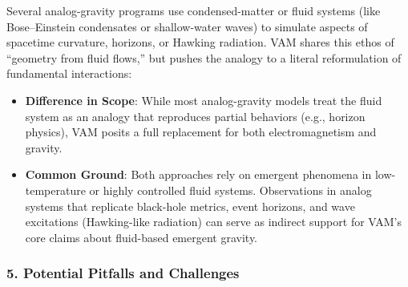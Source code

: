 Several analog-gravity programs use condensed-matter or fluid systems (like Bose–Einstein condensates or shallow-water waves) to simulate aspects of spacetime curvature, horizons, or Hawking radiation. VAM shares this ethos of “geometry from fluid flows,” but pushes the analogy to a literal reformulation of fundamental interactions:

\begin{itemize}
    \item \textbf{Difference in Scope}: While most analog-gravity models treat the fluid system as an analogy that reproduces partial behaviors (e.g., horizon physics), VAM posits a full replacement for both electromagnetism and gravity.
    \item \textbf{Common Ground}: Both approaches rely on emergent phenomena in low-temperature or highly controlled fluid systems. Observations in analog systems that replicate black-hole metrics, event horizons, and wave excitations (Hawking-like radiation) can serve as indirect support for VAM’s core claims about fluid-based emergent gravity.
\end{itemize}

\subsubsection*{5. Potential Pitfalls and Challenges}

